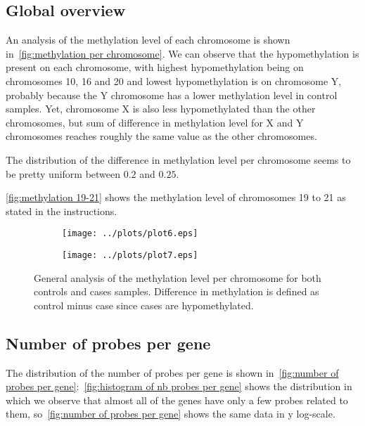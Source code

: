 \documentclass{article}
\begin{document}
\subsection{Global overview}

An analysis of the methylation level of each chromosome is shown in~\autoref{fig:methylation per chromosome}. We can observe that the
hypomethylation is present on each chromosome, with highest hypomethylation being on chromosomes 10, 16 and 20 and lowest hypomethylation
is on chromosome Y, probably because the Y chromosome has a lower methylation level in control samples. Yet, chromosome X is also
less hypomethylated than the other chromosomes, but sum of difference in methylation level for X and Y chromosomes reaches roughly
the same value as the other chromosomes.

The distribution of the difference in methylation level per chromosome seems to be pretty uniform between $0.2$ and $0.25$.

\autoref{fig:methylation 19-21} shows the methylation level of chromosomes 19 to 21 as stated in the instructions.

\begin{figure}[!t]
	\begin{subfigure}{.5\textwidth}
		\texttt{[image: ../plots/plot6.eps]}
	\end{subfigure}
	\begin{subfigure}{.5\textwidth}
		\texttt{[image: ../plots/plot7.eps]}
	\end{subfigure}
	\caption{General analysis of the methylation level per chromosome for both controls and cases samples. Difference in methylation
	is defined as control minus case since cases are hypomethylated.}
\end{figure}

\subsection{Number of probes per gene}

The distribution of the number of probes per gene is shown in~\autoref{fig:number of probes per gene}:~\autoref{fig:histogram of nb probes per gene}
shows the distribution in which we observe that almost all of the genes have only a few probes related to them, so~\autoref{fig:number of probes per gene}
shows the same data in y log-scale.
\end{document}
